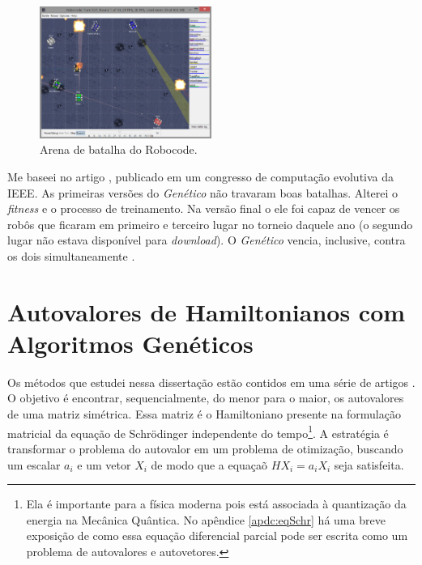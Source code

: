 	\begin{figure}[htbp]
		\centering
			\includegraphics[width=0.50\textwidth]{figs/materiais_metodo/ga/Robocode_Battle_Field.PNG}
		\caption{Arena de batalha do Robocode.}
		\label{fig:Robocode}
	\end{figure}
	
	Me baseei no artigo \cite{robocodeGA}, publicado em um congresso de computação evolutiva da IEEE. As primeiras versões do \emph{Genético} não travaram boas batalhas. Alterei o \emph{fitness} e o processo de treinamento. Na versão final o ele foi capaz de vencer os robôs que ficaram em primeiro e terceiro lugar no torneio daquele ano (o segundo lugar não estava disponível para \emph{download}). O \emph{Genético} vencia, inclusive, contra os dois simultaneamente \cite{robocodeGA_adriano}.
	
\section{Autovalores de Hamiltonianos com Algoritmos Genéticos\label{sec:metodo}}

	Os métodos que estudei nessa dissertação estão contidos em uma série de artigos \cite{metodo2002, metodo2004, metodo2006, metodo2008, metodo2009, metodo2011}. O objetivo é encontrar, sequencialmente, do menor para o maior, os autovalores de uma matriz simétrica. Essa matriz é o Hamiltoniano presente na formulação matricial da equação de Schrödinger independente do tempo\footnote{Ela é importante para a física moderna pois está associada à quantização da energia na Mecânica Quântica. No apêndice \ref{apdc:eqSchr} há uma breve exposição de como essa equação diferencial parcial pode ser escrita como um problema de autovalores e autovetores.}. A estratégia é transformar o problema do autovalor em um problema de otimização, buscando um escalar $a_i$ e um vetor $X_i$ de modo que a equaçaõ $HX_i = a_iX_i$ seja satisfeita.
	

